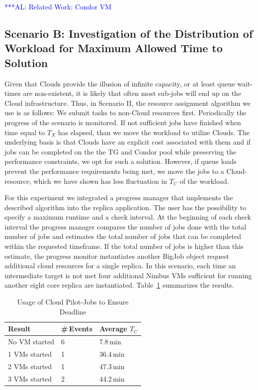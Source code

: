\documentclass[conference,final]{IEEEtran}
\newcommand{\tmax}{$T_{max}$ }
\newcommand{\tc}{$T_{C}$ }
\newcommand{\alnote}[1]{ {\textcolor{blue} { ***AL: #1 }}}
\newcommand{\alnote}[1]{}
\begin{document}
\alnote{Related Work: Condor VM}

\subsection{Scenario B: Investigation of the Distribution of Workload for Maximum Allowed
  Time to Solution} 

Given that Clouds provide the illusion of infinite capacity, or at
least queue wait-times are non-existent, it is likely that often most
sub-jobs will end up on the Cloud infrastructure.  Thus, in Scenario
II, the resource assignment algorithm we use is as follows: We submit
tasks to non-Cloud resources first. Periodically the progress of the
scenario is monitored. If not sufficient jobs have finished
when time equal to $T_{X}$ has elapsed,
than we move the workload to utilize Clouds.  The
underlying basis is that Clouds have an explicit cost associated with
them and if jobs can be completed on the the TG and Condor pool while
preserving the performance constraints, we opt for such a
solution. However, if queue loads prevent the performance requirements
being met, we move the jobs to a Cloud-resource, which we have shown
has less fluctuation in \tc of the workload.

For this experiment we integrated a progress manager that implements
the described algorithm into the replica application.  The user has
the possibility to specify a maximum runtime and a check interval.  At
the beginning of each check interval the progress manager compares the
number of jobs done with the total number of jobs and estimates the
total number of jobs that can be completed within the requested
timeframe. If the total number of jobs is higher than this estimate,
the progress monitor instantiates another BigJob object request
additional cloud resources for a single replica.  In this scenario,
each time an intermediate target is not met four additional Nimbus VMs
sufficient for running another eight core replica are instantiated.
Table~\ref{tab:app_deadline} summarizes the results.

\begin{table}[ht]
    \centering
	\begin{tabular}{|l|l|l|}
	\hline
    Result & \#\,Events &Average \tc \\ \hline
	No VM started &6 &7.8\,min\\ \hline
	1 VMs started &1 &36.4\,min\\ \hline
	2 VMs started &1 &47.3\,min\\ \hline
	3 VMs started &2 &44.2\,min\\ \hline
	\end{tabular}
	\caption{Usage of Cloud Pilot-Jobs to Ensure Deadline \label{tab:app_deadline}}
\end{table}
\end{document}
